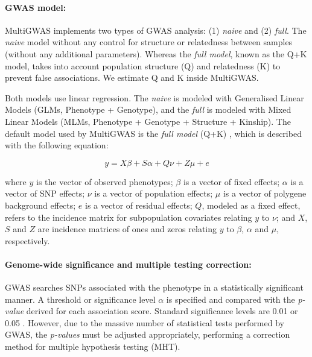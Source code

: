 \paragraph{GWAS model:}
MultiGWAS implements two types of GWAS analysis: (1) \textit{naive} and (2) \textit{full}. The \textit{naive} model without any control for structure or relatedness between samples (without any additional parameters). Whereas the \textit{full model}, known as the Q+K model, takes into account population structure (Q) and relatedness (K) to prevent false associations. We estimate Q and K inside MultiGWAS. 

Both models use linear regression. The \emph{naive} is modeled with Generalised Linear Models (GLMs, Phenotype + Genotype), and the \emph{full} is modeled with Mixed Linear Models (MLMs, Phenotype + Genotype + Structure + Kinship). The default model used by MultiGWAS is the \emph{full model} (Q+K) \cite{Yu2006}, which is described with the following equation:

\[
y=X\beta+S\alpha+Q\nu+Z\mu+e
\]

where $y$ is the vector of observed phenotypes; $\beta$ is a vector of fixed effects; $\alpha$ is a vector of SNP effects; $\nu$ is a vector of population effects; $\mu$ is a vector of polygene background effects; $e$ is a vector of residual effects; $Q$, modeled as a fixed effect, refers to the incidence matrix for subpopulation covariates relating $y$ to $\nu$; and $X$, $S$ and $Z$ are incidence matrices of ones and zeros relating $y$ to $\beta$, $\alpha$ and $\mu$, respectively.



\paragraph{Genome-wide significance and multiple testing correction:}
GWAS searches SNPs associated with the phenotype in a statistically significant manner. A threshold or significance level $\alpha$ is specified and compared with the \emph{p-value} derived for each association score. Standard significance levels are 0.01 or 0.05 \cite{Gumpinger2018,Rosyara2016}.  However, due to the massive number of statistical tests performed by GWAS, the \emph{p-values} must be adjusted appropriately, performing a correction method for multiple hypothesis testing (MHT). 

